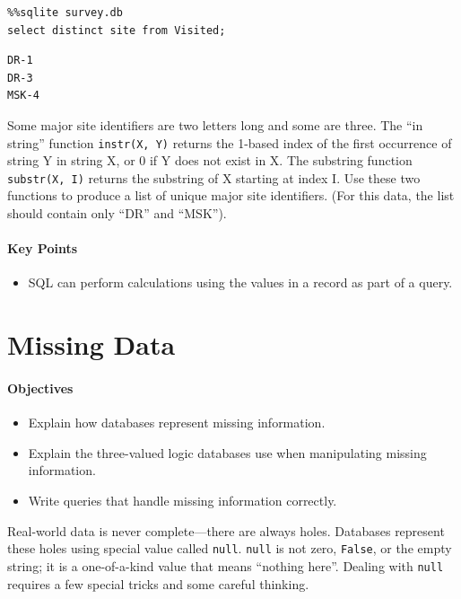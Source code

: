 \documentclass[]{book}
\begin{document}
\begin{verbatim}
%%sqlite survey.db
select distinct site from Visited;
\end{verbatim}

\begin{verbatim}
DR-1
DR-3
MSK-4
\end{verbatim}

Some major site identifiers are two letters long and some are three. The
``in string'' function \texttt{instr(X, Y)} returns the 1-based index of
the first occurrence of string Y in string X, or 0 if Y does not exist
in X. The substring function \texttt{substr(X, I)} returns the substring
of X starting at index I. Use these two functions to produce a list of
unique major site identifiers. (For this data, the list should contain
only ``DR'' and ``MSK'').

\mbox{}\paragraph{Key Points}

\begin{itemize}
\item
  SQL can perform calculations using the values in a record as part of a
  query.
\end{itemize}

\section{Missing Data}

\mbox{}\paragraph{Objectives}

\begin{itemize}
\item
  Explain how databases represent missing information.
\item
  Explain the three-valued logic databases use when manipulating missing
  information.
\item
  Write queries that handle missing information correctly.
\end{itemize}

Real-world data is never complete---there are always holes. Databases
represent these holes using special value called \texttt{null}.
\texttt{null} is not zero, \texttt{False}, or the empty string; it is a
one-of-a-kind value that means ``nothing here''. Dealing with
\texttt{null} requires a few special tricks and some careful thinking.
\end{document}
